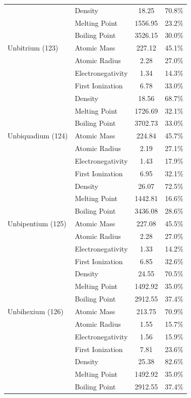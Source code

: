 \documentclass[12pt, a4paper]{article}
\begin{document}
\begin{longtable}{llcc}
& Density & 18.25 & 70.8\% \\
& Melting Point & 1556.95 & 23.2\% \\
& Boiling Point & 3526.15 & 30.0\% \\
\midrule
Unbitrium (123) & Atomic Mass & 227.12 & 45.1\% \\
& Atomic Radius & 2.28 & 27.0\% \\
& Electronegativity & 1.34 & 14.3\% \\
& First Ionization & 6.78 & 33.0\% \\
& Density & 18.56 & 68.7\% \\
& Melting Point & 1726.69 & 32.1\% \\
& Boiling Point & 3702.73 & 33.0\% \\
\midrule
Unbiquadium (124) & Atomic Mass & 224.84 & 45.7\% \\
& Atomic Radius & 2.19 & 27.1\% \\
& Electronegativity & 1.43 & 17.9\% \\
& First Ionization & 6.95 & 32.1\% \\
& Density & 26.07 & 72.5\% \\
& Melting Point & 1442.81 & 16.6\% \\
& Boiling Point & 3436.08 & 28.6\% \\
\midrule
Unbipentium (125) & Atomic Mass & 227.08 & 45.5\% \\
& Atomic Radius & 2.28 & 27.0\% \\
& Electronegativity & 1.33 & 14.2\% \\
& First Ionization & 6.85 & 32.6\% \\
& Density & 24.55 & 70.5\% \\
& Melting Point & 1492.92 & 35.0\% \\
& Boiling Point & 2912.55 & 37.4\% \\
\midrule
Unbihexium (126) & Atomic Mass & 213.75 & 70.9\% \\
& Atomic Radius & 1.55 & 15.7\% \\
& Electronegativity & 1.56 & 15.9\% \\
& First Ionization & 7.81 & 23.6\% \\
& Density & 25.38 & 82.6\% \\
& Melting Point & 1492.92 & 35.0\% \\
& Boiling Point & 2912.55 & 37.4\% \\
\end{longtable}
\end{document}
